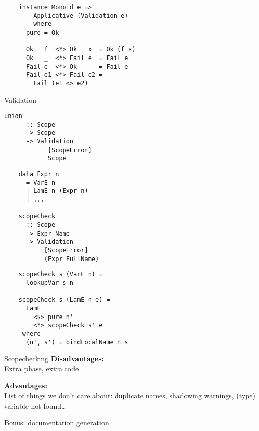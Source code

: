 \documentclass[20pt]{beamer}
\newcommand{\vspaced}{
    \vspace{5mm}
}
\begin{document}
\begin{frame}
    \begin{lstlisting}
    instance Monoid e =>
        Applicative (Validation e)
        where
      pure = Ok

      Ok   f  <*> Ok   x  = Ok (f x)
      Ok   _  <*> Fail e  = Fail e
      Fail e  <*> Ok   _  = Fail e
      Fail e1 <*> Fail e2 =
        Fail (e1 <> e2)
    \end{lstlisting}
\end{frame}

\begin{frame}[fragile]{Validation}
    \begin{lstlisting}[keywords = {}]
    union
      :: Scope
      -> Scope
      -> Validation
            [ScopeError]
            Scope
    \end{lstlisting}
\end{frame}

\begin{frame}
    \begin{lstlisting}
    data Expr n
      = VarE n
      | LamE n (Expr n)
      | ...

    scopeCheck
      :: Scope
      -> Expr Name
      -> Validation
           [ScopeError]
           (Expr FullName)
    \end{lstlisting}
\end{frame}

\begin{frame}
    \begin{lstlisting}
    scopeCheck s (VarE n) =
      lookupVar s n

    scopeCheck s (LamE n e) =
      LamE
        <$> pure n'
        <*> scopeCheck s' e
     where
      (n', s') = bindLocalName n s
    \end{lstlisting}
\end{frame}

\begin{frame}{Scopechecking}
    \textbf{Disadvantages:} \\
    Extra phase, extra code \\
    \vspaced
    \textbf{Advantages:} \\
    List of things we don't care about:
    duplicate names, shadowing warnings,
    (type) variable not found\dots
\end{frame}

\begin{frame}
    Bonus: documentation generation
\end{frame}
\end{document}
